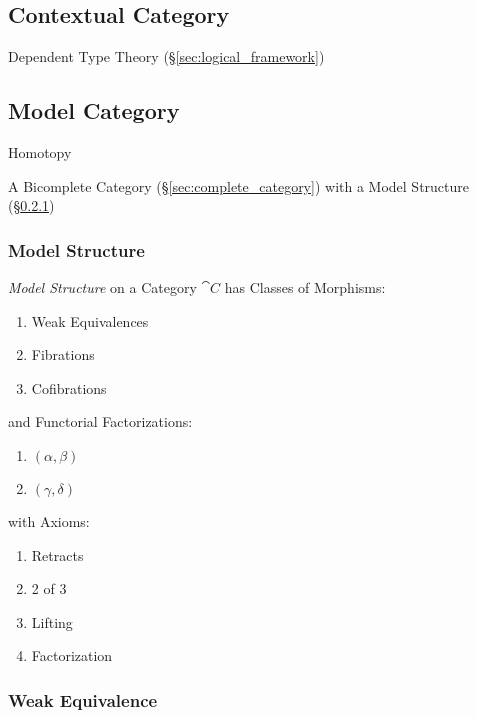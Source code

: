 \subsection{Contextual Category}\label{sec:contextual_category}

Dependent Type Theory (\S\ref{sec:logical_framework})



\subsection{Model Category}\label{sec:model_category}

Homotopy

A Bicomplete Category (\S\ref{sec:complete_category}) with a Model
Structure (\S\ref{sec:model_structure})



\subsubsection{Model Structure}\label{sec:model_structure}

\emph{Model Structure} on a Category $\cat{C}$ has Classes of
Morphisms:
\begin{enumerate}
  \item Weak Equivalences
  \item Fibrations
  \item Cofibrations
\end{enumerate}
and Functorial Factorizations:
\begin{enumerate}
  \item $(\alpha,\beta)$
  \item $(\gamma,\delta)$
\end{enumerate}
with Axioms:
\begin{enumerate}
  \item Retracts
  \item 2 of 3
  \item Lifting
  \item Factorization
\end{enumerate} %




\subsubsection{Weak Equivalence}\label{sec:weak_equivalence}



